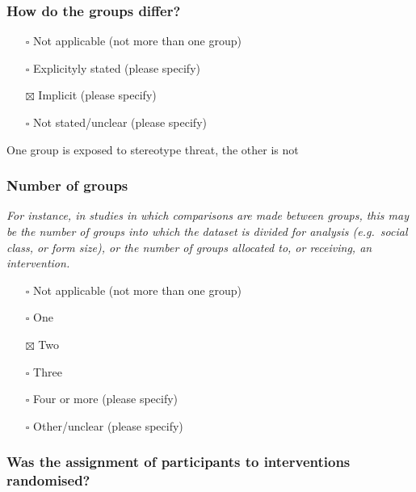 \documentclass[
  doc, a4paper]{apa7}
\providecommand{\tightlist}{%
  \setlength{\itemsep}{0pt}\setlength{\parskip}{0pt}}
\begin{document}
\subsubsection{How do the groups differ?}\label{how-do-the-groups-differ}

\begin{itemize}
\tightlist
\item[$\square$]
  Not applicable (not more than one group)\\
\item[$\square$]
  Explicityly stated (please specify)\\
\item[$\boxtimes$]
  Implicit (please specify)\\
\item[$\square$]
  Not stated/unclear (please specify)
\end{itemize}

One group is exposed to stereotype threat, the other is not

\subsubsection{Number of groups}\label{number-of-groups}

\emph{For instance, in studies in which comparisons are made between groups, this may be the number of groups into which the dataset is divided for analysis (e.g.~social class, or form size), or the number of groups allocated to, or receiving, an intervention.}

\begin{itemize}
\tightlist
\item[$\square$]
  Not applicable (not more than one group)\\
\item[$\square$]
  One\\
\item[$\boxtimes$]
  Two\\
\item[$\square$]
  Three\\
\item[$\square$]
  Four or more (please specify)\\
\item[$\square$]
  Other/unclear (please specify)
\end{itemize}

\subsubsection{Was the assignment of participants to interventions randomised?}\label{was-the-assignment-of-participants-to-interventions-randomised}
\end{document}
